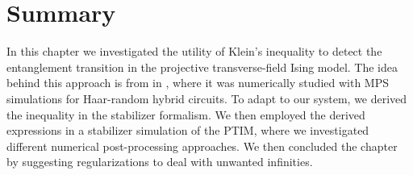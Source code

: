 \section{Summary}
In this chapter we investigated the utility of Klein's inequality to detect the
entanglement transition in the projective transverse-field Ising model. 
The idea behind this approach is from
\citeauthor{garrattProbingPostmeasurementEntanglement2023} in
\cite{garrattProbingPostmeasurementEntanglement2023}, where it was numerically
studied with MPS simulations for Haar-random hybrid circuits. To adapt to our
system, we derived the inequality in the stabilizer formalism. We then employed
the derived expressions in a stabilizer simulation of the PTIM, where we
investigated different numerical post-processing approaches. We then concluded
the chapter by suggesting regularizations to deal with unwanted infinities.

